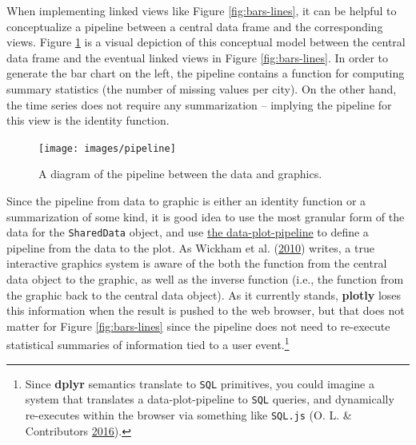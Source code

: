 \documentclass[12pt,]{isuthesis}
\let\rmarkdownfootnote\footnote%
\def\footnote{\protect\rmarkdownfootnote}
\begin{document}
When implementing linked views like Figure \ref{fig:bars-lines}, it can
be helpful to conceptualize a pipeline between a central data frame and
the corresponding views. Figure \ref{fig:pipeline} is a visual depiction
of this conceptual model between the central data frame and the eventual
linked views in Figure \ref{fig:bars-lines}. In order to generate the
bar chart on the left, the pipeline contains a function for computing
summary statistics (the number of missing values per city). On the other
hand, the time series does not require any summarization -- implying the
pipeline for this view is the identity function.

\begin{figure}
\texttt{[image: images/pipeline]} \caption{A diagram of the pipeline between the data and graphics.}\label{fig:pipeline}
\end{figure}

Since the pipeline from data to graphic is either an identity function
or a summarization of some kind, it is good idea to use the most
granular form of the data for the \texttt{SharedData} object, and use
\protect\hyperlink{the-data-plot-pipeline}{the data-plot-pipeline} to
define a pipeline from the data to the plot. As Wickham et al.
(\protect\hyperlink{ref-plumbing}{2010}) writes, a true interactive
graphics system is aware of the both the function from the central data
object to the graphic, as well as the inverse function (i.e., the
function from the graphic back to the central data object). As it
currently stands, \textbf{plotly} loses this information when the result
is pushed to the web browser, but that does not matter for Figure
\ref{fig:bars-lines} since the pipeline does not need to re-execute
statistical summaries of information tied to a user event.\footnote{Since
  \textbf{dplyr} semantics translate to \texttt{SQL} primitives, you
  could imagine a system that translates a data-plot-pipeline to
  \texttt{SQL} queries, and dynamically re-executes within the browser
  via something like \texttt{SQL.js} (O. L. \& Contributors
  \protect\hyperlink{ref-SQLjs}{2016}).}
\end{document}
